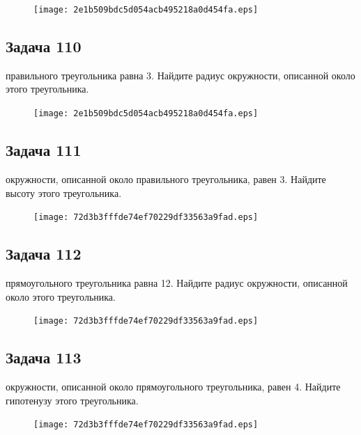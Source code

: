 \documentclass[a4paper,10pt]{article} %
\begin{document}
\begin{spacing}{1.0}
{\begin{figure}{\texttt{[image: 2e1b509bdc5d054acb495218a0d454fa.eps]}}\end{figure}
\subsection*{Задача 110}
 правильного треугольника равна 3. Найдите радиус окружности, описанной около этого треугольника.

\vspace{1.5cm}

\begin{figure}{\texttt{[image: 2e1b509bdc5d054acb495218a0d454fa.eps]}}\end{figure}
\subsection*{Задача 111}
 окружности, описанной около правильного треугольника, равен 3. Найдите высоту этого треугольника.



\vspace{1.5cm}

\begin{figure}{\texttt{[image: 72d3b3fffde74ef70229df33563a9fad.eps]}}\end{figure}
\subsection*{Задача 112}
 прямоугольного треугольника равна 12. Найдите радиус окружности, описанной около этого треугольника.

\vspace{1.5cm}

\begin{figure}{\texttt{[image: 72d3b3fffde74ef70229df33563a9fad.eps]}}\end{figure}
\subsection*{Задача 113}
 окружности, описанной около прямоугольного треугольника, равен 4. Найдите гипотенузу этого треугольника.

\vspace{3cm}

\begin{figure}{\texttt{[image: 72d3b3fffde74ef70229df33563a9fad.eps]}}\end{figure}
}
\end{spacing}
\end{document}
